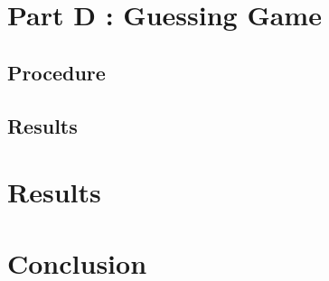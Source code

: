 \documentclass[a4paper,11pt]{article}
\begin{document}

\section{Part D : Guessing Game}
\subsection{Procedure}
\subsection{Results}
\section{Results}



\section{Conclusion}
\end{document}
